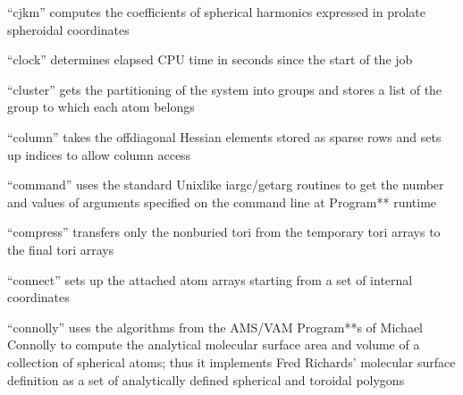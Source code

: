 \documentclass[letterpaper,11pt,english]{sphinxmanual}
\begin{document}


“cjkm” computes the coefficients of spherical harmonics expressed in prolate spheroidal coordinates







“clock” determines elapsed CPU time in seconds since the start of the job


“cluster” gets the partitioning of the system into groups and stores a list of the group to which each atom belongs


“column” takes the off\sphinxhyphen{}diagonal Hessian elements stored as sparse rows and sets up indices to allow column access


“command” uses the standard Unix\sphinxhyphen{}like iargc/getarg routines to get the number and values of arguments specified on the command line at Program** runtime


“compress” transfers only the non\sphinxhyphen{}buried tori from the temporary tori arrays to the final tori arrays


“connect” sets up the attached atom arrays starting from a set of internal coordinates


“connolly” uses the algorithms from the AMS/VAM Program**s of Michael Connolly to compute the analytical molecular surface area and volume of a collection of spherical atoms; thus it implements Fred Richards’ molecular surface definition as a set of analytically defined spherical and toroidal polygons

\end{document}
